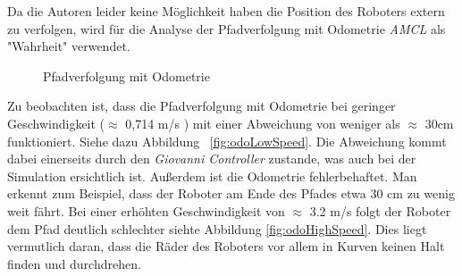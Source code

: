 \documentclass[11pt,a4paper]{article}
\begin{document}
{Da die Autoren leider keine M\"oglichkeit haben die Position des Roboters extern zu verfolgen, wird f\"ur die Analyse der Pfadverfolgung mit Odometrie \textit{AMCL} als "Wahrheit" verwendet.
\newpage
\begin{figure}
	\centering
	\caption{Pfadverfolgung mit Odometrie}
\end{figure}

Zu beobachten ist, dass die Pfadverfolgung mit Odometrie bei geringer Geschwindigkeit ($\approx$ 0,714 m/s ) mit einer Abweichung von weniger als $\approx$ 30cm funktioniert. Siehe dazu Abbildung ~\ref{fig:odoLowSpeed}. Die Abweichung kommt dabei einerseits durch den \textit{Giovanni Controller} zustande, was auch bei der Simulation ersichtlich ist. Au{\ss}erdem ist die Odometrie fehlerbehaftet. Man erkennt zum Beispiel, dass der Roboter am Ende des Pfades etwa 30 cm zu wenig weit f\"ahrt.
Bei einer erh\"ohten Geschwindigkeit von $\approx$ 3.2 m/s folgt der Roboter dem Pfad deutlich schlechter siehte Abbildung \ref{fig:odoHighSpeed}. Dies liegt vermutlich daran, dass die R\"ader des Roboters vor allem in Kurven keinen Halt finden und durchdrehen.   

 

}
\end{document}
